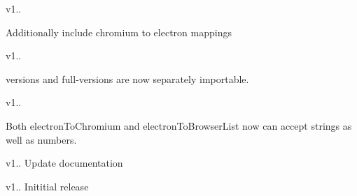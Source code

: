 v1..
\begin{DoxyItemize}
\item Additionally include chromium to electron mappings
\end{DoxyItemize}

v1..
\begin{DoxyItemize}
\item versions and full-\/versions are now separately importable.
\end{DoxyItemize}

v1..
\begin{DoxyItemize}
\item Both electron\+To\+Chromium and electron\+To\+Browser\+List now can accept strings as well as numbers.
\end{DoxyItemize}

v1.. Update documentation

v1.. Inititial release 